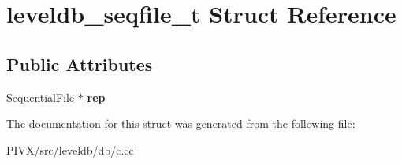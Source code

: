 \hypertarget{structleveldb__seqfile__t}{}\section{leveldb\+\_\+seqfile\+\_\+t Struct Reference}
\label{structleveldb__seqfile__t}
\subsection*{Public Attributes}
\begin{DoxyCompactItemize}
\item 
\mbox{\label{structleveldb__seqfile__t_a84b4a8638a6ad109e65b3c7923fde915}} 
\mbox{\hyperlink{classleveldb_1_1_sequential_file}{Sequential\+File}} $\ast$ {\bfseries rep}
\end{DoxyCompactItemize}


The documentation for this struct was generated from the following file\+:\begin{DoxyCompactItemize}
\item 
P\+I\+V\+X/src/leveldb/db/c.\+cc\end{DoxyCompactItemize}
